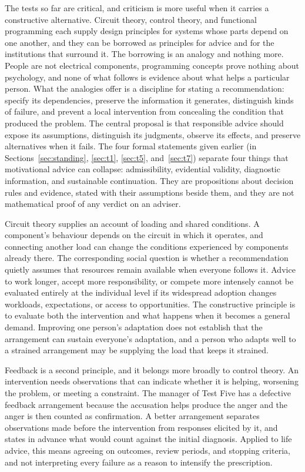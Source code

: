 \documentclass[12pt]{article}
\begin{document}
The tests so far are critical, and criticism is more useful when it carries a constructive alternative. Circuit theory, control theory, and functional programming each supply design principles for systems whose parts depend on one another, and they can be borrowed as principles for advice and for the institutions that surround it. The borrowing is an analogy and nothing more. People are not electrical components, programming concepts prove nothing about psychology, and none of what follows is evidence about what helps a particular person. What the analogies offer is a discipline for stating a recommendation: specify its dependencies, preserve the information it generates, distinguish kinds of failure, and prevent a local intervention from concealing the condition that produced the problem. The central proposal is that responsible advice should expose its assumptions, distinguish its judgments, observe its effects, and preserve alternatives when it fails. The four formal statements given earlier (in Sections~\ref{sec:standing}, \ref{sec:t1}, \ref{sec:t5}, and~\ref{sec:t7}) separate four things that motivational advice can collapse: admissibility, evidential validity, diagnostic information, and sustainable continuation. They are propositions about decision rules and evidence, stated with their assumptions beside them, and they are not mathematical proof of any verdict on an adviser.

Circuit theory supplies an account of loading and shared conditions. A component's behaviour depends on the circuit in which it operates, and connecting another load can change the conditions experienced by components already there. The corresponding social question is whether a recommendation quietly assumes that resources remain available when everyone follows it. Advice to work longer, accept more responsibility, or compete more intensely cannot be evaluated entirely at the individual level if its widespread adoption changes workloads, expectations, or access to opportunities. The constructive principle is to evaluate both the intervention and what happens when it becomes a general demand. Improving one person's adaptation does not establish that the arrangement can sustain everyone's adaptation, and a person who adapts well to a strained arrangement may be supplying the load that keeps it strained.

Feedback is a second principle, and it belongs more broadly to control theory. An intervention needs observations that can indicate whether it is helping, worsening the problem, or meeting a constraint. The manager of Test Five has a defective feedback arrangement because the accusation helps produce the anger and the anger is then counted as confirmation. A better arrangement separates observations made before the intervention from responses elicited by it, and states in advance what would count against the initial diagnosis. Applied to life advice, this means agreeing on outcomes, review periods, and stopping criteria, and not interpreting every failure as a reason to intensify the prescription.
\end{document}
